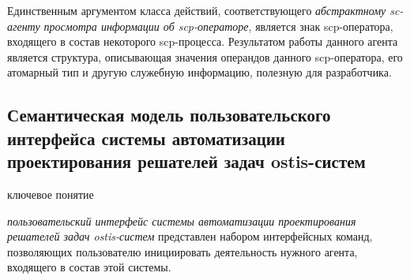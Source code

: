 Единственным аргументом класса действий, соответствующего \textit{абстрактному sc-агенту просмотра информации об scp-операторе}, является знак scp-оператора, входящего в состав некоторого scp-процесса. Результатом работы данного агента является структура, описывающая значения операндов данного scp-оператора, его атомарный тип и другую служебную информацию, полезную для разработчика.

\subsection{Семантическая модель пользовательского интерфейса системы автоматизации проектирования решателей задач ostis-систем}
\begin{SCn}
\bigskip

\begin{scnrelfromlist}{ключевое понятие}
\end{scnrelfromlist}
\end{SCn}
\label{sub_sec_interface_ps_des_auto_sys}
\textit{пользовательский интерфейс системы автоматизации проектирования решателей задач ostis-систем} представлен набором интерфейсных команд, позволяющих пользователю инициировать деятельность нужного агента, входящего в состав этой системы.

